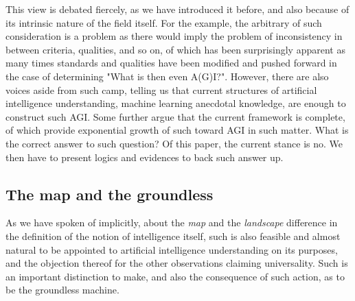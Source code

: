 This view is debated fiercely, as we have introduced it before, and also because of its intrinsic nature of the field itself. For the example, the arbitrary of such consideration is a problem as there would imply the problem of inconsistency in between criteria, qualities, and so on, of which has been surprisingly apparent as many times standards and qualities have been modified and pushed forward in the case of determining "What is then even A(G)I?". However, there are also voices aside from such camp, telling us that current structures of artificial intelligence understanding, machine learning anecdotal knowledge, are enough to construct such AGI. Some further argue that the current framework is complete, of which provide exponential growth of such toward AGI in such matter. What is the correct answer to such question? Of this paper, the current stance is no. We then have to present logics and evidences to back such answer up. 

\subsection{The map and the groundless}

As we have spoken of implicitly, about the \textit{map} and the \textit{landscape} difference in the definition of the notion of intelligence itself, such is also feasible and almost natural to be appointed to artificial intelligence understanding on its purposes, and the objection thereof for the other observations claiming universality. Such is an important distinction to make, and also the consequence of such action, as to be the groundless machine. 

